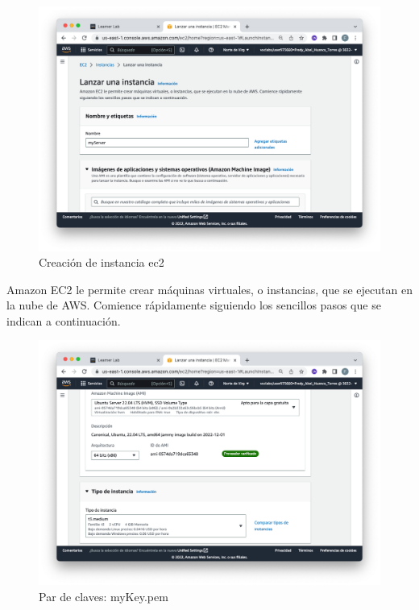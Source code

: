 \clearpage

\begin{figure}[h]
	\centering
	\includegraphics[scale=.3] {img/01}
	\caption{Creación de instancia ec2}
	\label{fig:1}	
\end{figure}

Amazon EC2 le permite crear máquinas virtuales, o instancias, que se ejecutan en la nube de AWS. Comience rápidamente siguiendo los sencillos pasos que se indican a continuación.

\begin{figure}[h]
	\centering
	\includegraphics[scale=.3] {img/02}
	\caption{Par de claves: myKey.pem}
	\label{fig:2}	
\end{figure}


\clearpage


